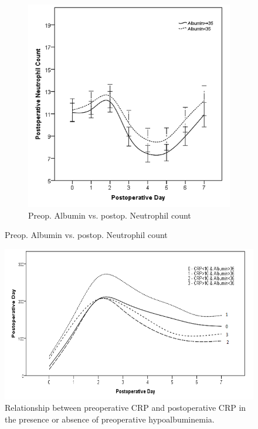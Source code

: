 \begin{figure}[p]
	\vspace{1cm}
	
	\begin{subfigure}{0.48\textwidth}
		\centering
		\includegraphics[width=\textwidth]{Figures/sirs_alb_neut}
		\caption{Preop. Albumin vs. postop. Neutrophil count}
		\label{fig:sirs_alb_neut}
	\end{subfigure}	
\end{figure}

\clearpage
\begin{figure}[t]
	\centering
	\includegraphics[width=\textwidth]{Figures/sirs_crp_crp_alb}
	\caption{Relationship between preoperative CRP and postoperative CRP in the presence or absence of preoperative hypoalbuminemia.}
	\label{fig:sirs_crp_crp_alb}
\end{figure}

\clearpage

